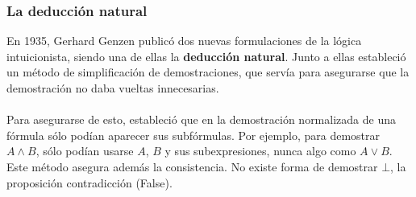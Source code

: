 \documentclass{beamer}
\begin{document}

    \begin{frame}
      \frametitle{La deducción natural}
      En 1935, Gerhard Genzen publicó dos nuevas formulaciones de la lógica intuicionista, siendo
      una de ellas la \textbf{deducción natural}. Junto a ellas estableció un método
      de simplificación de demostraciones, que servía para asegurarse que la demostración
      no daba vueltas innecesarias. \\~\\
      
      Para asegurarse de esto, estableció que en la demostración normalizada de una
      fórmula sólo podían aparecer sus subfórmulas. Por ejemplo, para demostrar $A \wedge B$,
      sólo podían usarse $A$, $B$ y sus subexpresiones, nunca algo como $A \vee B$.
      Este método asegura además la consistencia. No existe forma de demostrar $\bot$,
      la proposición contradicción (False).
    \end{frame}


        
\end{document}
